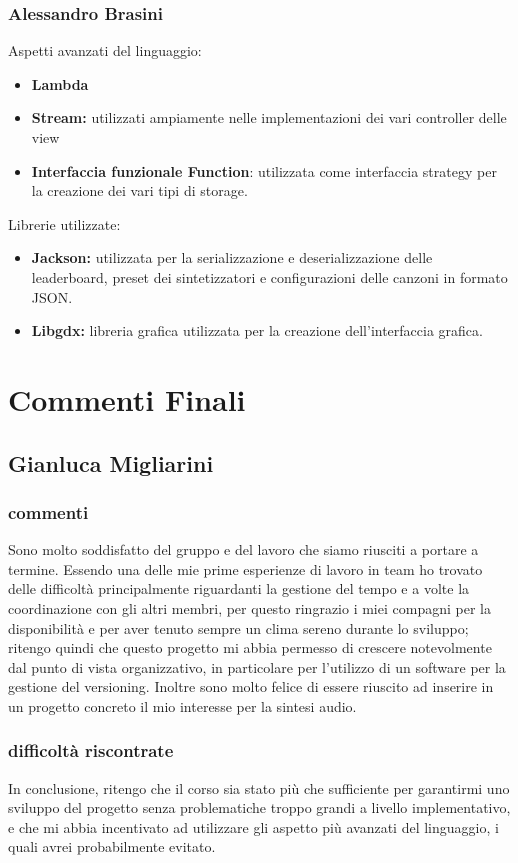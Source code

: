 \documentclass[a4paper,12pt]{report}
\begin{document}
\subsection{Alessandro Brasini}
Aspetti avanzati del linguaggio:
\begin{itemize}
	\item \textbf{Lambda}
	\item \textbf{Stream:} utilizzati ampiamente nelle implementazioni dei vari controller delle view
	\item \textbf{Interfaccia funzionale Function}: utilizzata come interfaccia strategy per la creazione dei vari tipi di storage.
\end{itemize}
Librerie utilizzate:
\begin{itemize}
	\item \textbf{Jackson:} utilizzata per la serializzazione e deserializzazione delle leaderboard, preset dei sintetizzatori e configurazioni delle canzoni
	in formato JSON.
	\item \textbf{Libgdx:} libreria grafica utilizzata per la creazione dell'interfaccia grafica.
\end{itemize}
\newpage




\chapter{Commenti Finali}


\section{Gianluca Migliarini}
\subsection{commenti}
Sono molto soddisfatto del gruppo e del lavoro che siamo riusciti a portare a termine.
Essendo una delle mie prime esperienze di lavoro in team ho trovato delle difficoltà principalmente riguardanti
la gestione del tempo e a volte la coordinazione con gli altri membri, per questo ringrazio i miei compagni per la disponibilità e per aver tenuto sempre un clima sereno durante lo sviluppo; ritengo quindi che questo progetto mi abbia permesso di crescere notevolmente dal punto di vista organizzativo, in particolare per l'utilizzo di un software per la gestione del versioning.
Inoltre sono molto felice di essere riuscito ad inserire in un progetto concreto il mio interesse per la sintesi audio.
\subsection{difficoltà riscontrate}
In conclusione, ritengo che il corso sia stato più che sufficiente per garantirmi uno sviluppo del progetto senza problematiche troppo grandi a livello implementativo, e che mi abbia incentivato ad utilizzare gli aspetto più avanzati del linguaggio, i quali avrei probabilmente evitato.
\newpage
\end{document}
